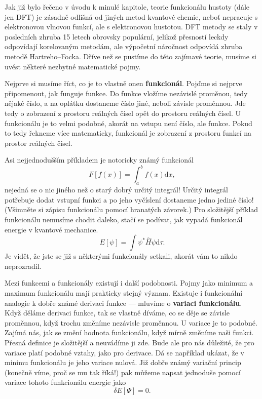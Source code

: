 Jak již bylo řečeno v úvodu k minulé kapitole, teorie funkcionálu hustoty (dále jen DFT) je zásadně odlišná od jiných metod kvantové chemie, neboť nepracuje s elektronovou vlnovou funkcí, ale s elektronovou hustotou. DFT metody se staly v posledních zhruba 15 letech obrovsky populární, jelikož přesností leckdy odpovídají korelovaným metodám, ale výpočetní náročnost odpovídá zhruba metodě Hartreho--Focka. Dříve než se pustíme do této zajímavé teorie, musíme si uvést některé nezbytné matematické pojmy. 

Nejprve si musíme říct, co je to vlastně onen \textbf{funkcionál}. Pojďme si nejprve připomenout, jak funguje funkce. Do funkce vložíme nezávislé proměnou, tedy nějaké číslo, a na oplátku dostaneme číslo jiné, neboli závisle proměnnou. Jde tedy o zobrazení z prostoru reálných čísel opět do prostoru reálných čísel. U funkcionálu je to velmi podobné, akorát na vstupu není číslo, ale funkce. Pokud to tedy řekneme více matematicky, funkcionál je zobrazení z prostoru funkcí na prostor reálných čísel.

Asi nejjednodušším příkladem je notoricky známý funkcionál
$$
F[f(x)] = \int_a^b f(x) \mathrm{d}x, 
$$
nejedná se o nic jiného než o starý dobrý určitý integrál! Určitý integrál potřebuje dodat vstupní funkci a po jeho vyčíslení dostaneme jedno jediné číslo! (Všimněte si zápisu funkcionálu pomocí hranatých závorek.)  
Pro složitější příklad funkcionálu nemusíme chodit daleko, stačí se podívat, jak vypadá funkcionál energie v kvantové mechanice.
$$
E[\psi] = \int \psi^*\hat{H}\psi \mathrm{d}\tau .
$$
Je vidět, že jste se již s některými funkcionály setkali, akorát vám to nikdo neprozradil.

Mezi funkcemi a funkcionály existují i další podobnosti. Pojmy jako minimum a maximum funkcionálu mají prakticky stejný význam. Existuje i funkcionální analogie k dobře známé derivaci funkce --- mluvíme o \textbf{variaci funkcionálu}.
Když děláme derivaci funkce, tak se vlastně díváme, co se děje se závisle proměnnou, když trochu změníme nezávisle proměnnou.
U variace je to podobné. Zajímá nás, jak se změní hodnota funkcionálu, když mírně změníme naši funkci. Přesná definice je složitější a neuvádíme ji zde. Bude ale pro nás důležité, že pro variace platí podobné vztahy, jako pro derivace. Dá se například ukázat, že v minimu funkcionálu je jeho variace nulová. Již dobře známý variační princip (konečně víme, proč se mu tak říká!) pak můžeme napsat jednoduše pomocí variace tohoto funkcionálu energie jako
$$
\delta E[\Psi] = 0 .
$$

